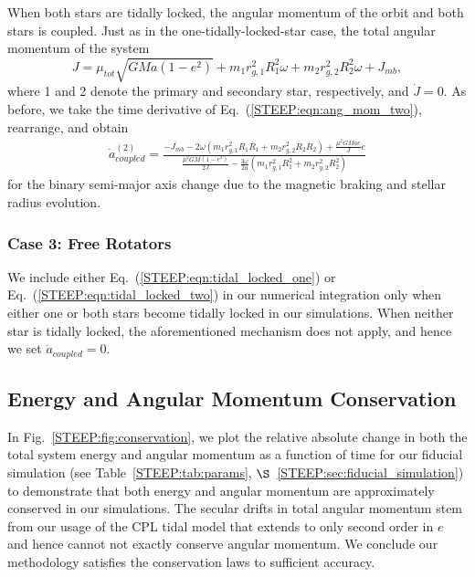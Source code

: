 When both stars are tidally locked, the angular momentum of the orbit and both stars is coupled.  Just as in the one-tidally-locked-star case, the total angular momentum of the system 
\begin{equation} \label{STEEP:eqn:ang_mom_two}
J = \mu_{tot} \sqrt{GMa(1-e^2)} + m_1 r_{g,1}^2 R_1^2 \omega + m_2 r_{g,2}^2 R_2^2 \omega + J_{mb},
\end{equation}
where 1 and 2 denote the primary and secondary star, respectively, and $\dot{J} = 0$.  As before, we take the time derivative of Eq.~(\ref{STEEP:eqn:ang_mom_two}), rearrange, and obtain
\small
\begin{equation} \label{STEEP:eqn:tidal_locked_two}
\begin{split}
\dot{a}_{coupled}^{(2)} = \frac{-\dot{J_{mb}} - 2 \omega \left( m_1 r_{g,1}^2 R_1 \dot{R_1} + m_2 r_{g,2}^2 R_2 \dot{R_2} \right) + \frac{\mu^2 G M a e }{J} \dot{e}}
{\frac{\mu^2 G M (1-e^2)}{2J} - \frac{3 \omega}{2a} \left( m_1 r_{g,1}^2 R_1^2 + m_2 r_{g,2}^2 R_2^2 \right)}
\end{split}
\end{equation}
\normalsize
for the binary semi-major axis change due to the magnetic braking and stellar radius evolution.  

\subsubsection{Case 3: Free Rotators}

We include either Eq.~(\ref{STEEP:eqn:tidal_locked_one}) or Eq.~(\ref{STEEP:eqn:tidal_locked_two}) in our numerical integration only when either one or both stars become tidally locked in our simulations.  When neither star is tidally locked, the aforementioned mechanism does not apply, and hence we set $\dot{a}_{coupled} = 0$.

\subsection{Energy and Angular Momentum Conservation} \label{STEEP:sec:conservation}

In Fig.~\ref{STEEP:fig:conservation}, we plot the relative absolute change in both the total system energy and angular momentum as a function of time for our fiducial simulation (see Table~\ref{STEEP:tab:params}, $\S$~\ref{STEEP:sec:fiducial_simulation}) to demonstrate that both energy and angular momentum are approximately conserved in our 
\vplanet simulations.  The secular drifts in total angular momentum stem from our usage of the CPL tidal model that extends to only second order in $e$ and hence cannot not exactly conserve angular momentum.  We conclude our methodology satisfies the conservation laws to sufficient accuracy.

